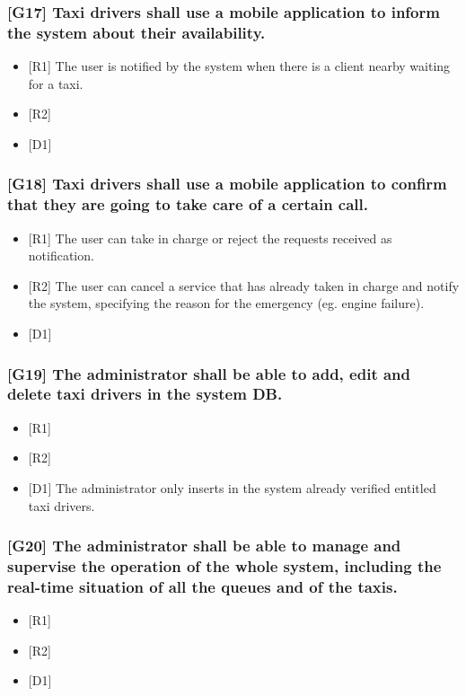 \documentclass[a4paper,11pt]{report} %
\begin{document}
	\subsubsection{{[}G17{]} Taxi drivers shall use a mobile application to inform the system about their availability.}
	\begin{itemize}
		\item {[}R1{]} The user is notified by the system when there is a client nearby waiting for a taxi.
		\item {[}R2{]}
		\item {[}D1{]}
	\end{itemize}
	
	\subsubsection{{[}G18{]} Taxi drivers shall use a mobile application to confirm that they are going to take care of a certain call.}
	\begin{itemize}
		\item {[}R1{]} The user can take in charge or reject the requests received as notification.
		\item {[}R2{]} The user can cancel a service that has already taken in charge and notify the system, specifying the reason for the emergency (eg. engine failure).
		\item {[}D1{]}
	\end{itemize}	
					
	\subsubsection{{[}G19{]} The administrator shall be able to add, edit and delete taxi drivers in the system DB.}
	\begin{itemize}
		\item {[}R1{]} 
		\item {[}R2{]} 
		\item {[}D1{]} The administrator only inserts in the system already verified entitled taxi drivers.
	\end{itemize}	
	
	\subsubsection{{[}G20{]} The administrator shall be able to manage and supervise the operation of the whole system, including the real-time situation of all the queues and of the taxis.}
	\begin{itemize}
		\item {[}R1{]} 
		\item {[}R2{]} 
		\item {[}D1{]}
	\end{itemize}							
		
\end{document}

